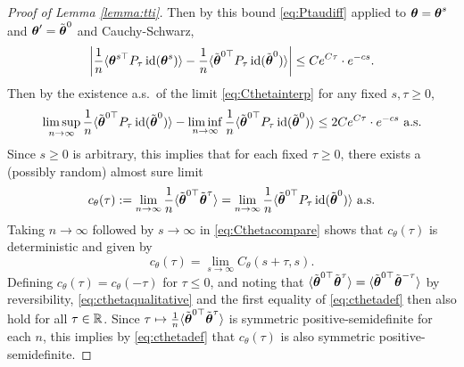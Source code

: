 \begin{proof}[Proof of Lemma \ref{lemma:tti}]
Then by this bound \eqref{eq:Ptaudiff}
applied to $\boldsymbol{\theta}=\boldsymbol{\theta}^s$ and $\boldsymbol{\theta}'=\tilde {\boldsymbol{\theta}}^0$ and
Cauchy-Schwarz,
\begin{equation}\label{eq:Cthetacompare}
\left|\frac{1}{n}\langle \boldsymbol{\theta}^{s\top} P_\tau\operatorname{id}(\boldsymbol{\theta}^s) \rangle
-\frac{1}{n}\langle \tilde {\boldsymbol{\theta}}^{0\top} P_\tau\operatorname{id}(\tilde {\boldsymbol{\theta}}^0)
\rangle\right| \leq Ce^{C\tau} \cdot e^{-cs}.
\end{equation}
Then by the existence a.s.\ of the limit \eqref{eq:Cthetainterp} for any fixed
$s,\tau \geq 0$,
\[\limsup_{n \to \infty}
\frac{1}{n}\langle \tilde {\boldsymbol{\theta}}^{0\top} P_\tau\operatorname{id}(\tilde {\boldsymbol{\theta}}^0)
\rangle-\liminf_{n \to \infty}
\frac{1}{n}\langle \tilde {\boldsymbol{\theta}}^{0\top} P_\tau\operatorname{id}(\tilde {\boldsymbol{\theta}}^0)
\rangle \leq 2Ce^{C\tau} \cdot e^{-cs} \text{ a.s.}\]
Since $s \geq 0$ is arbitrary, this implies that for each fixed $\tau \geq 0$,
there exists a (possibly random) almost sure limit
\begin{equation}\label{eq:cthetadef}
c_\theta(\tau):=\lim_{n \to \infty} 
\frac{1}{n}\langle \tilde {\boldsymbol{\theta}}^{0\top} \tilde {\boldsymbol{\theta}}^\tau
\rangle=\lim_{n \to \infty} 
\frac{1}{n}\langle \tilde {\boldsymbol{\theta}}^{0\top} P_\tau\operatorname{id}(\tilde
{\boldsymbol{\theta}}^0)\rangle \text{ a.s.}
\end{equation}
Taking $n \to \infty$ followed by $s \to \infty$
in \eqref{eq:Cthetacompare} shows that $c_\theta(\tau)$ is deterministic and
given by
\begin{equation}\label{eq:cthetaqualitative}
c_\theta(\tau)=\lim_{s \to \infty} C_\theta(s+\tau,s).
\end{equation}
Defining $c_\theta(\tau)=c_\theta(-\tau)$ for $\tau \leq 0$, and noting that
$\langle \tilde {\boldsymbol{\theta}}^{0\top} \tilde {\boldsymbol{\theta}}^\tau \rangle
=\langle \tilde {\boldsymbol{\theta}}^{0\top} \tilde {\boldsymbol{\theta}}^{-\tau} \rangle$ by
reversibility, \eqref{eq:cthetaqualitative} and
the first equality of \eqref{eq:cthetadef} then also hold for all $\tau \in \mathbb{R}$.
Since $\tau \mapsto \frac{1}{n}\langle \tilde {\boldsymbol{\theta}}^{0\top} \tilde {\boldsymbol{\theta}}^\tau \rangle$ is symmetric positive-semidefinite for each $n$,
this implies by \eqref{eq:cthetadef}
that $c_\theta(\tau)$ is also symmetric positive-semidefinite.


\end{proof}
